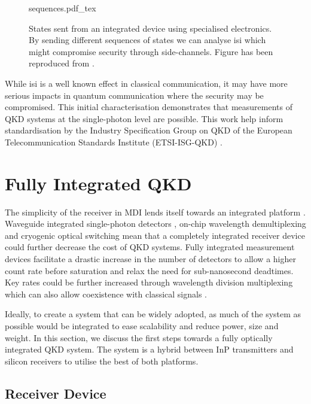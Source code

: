 \begin{figure}[t]
	\centering
	\tiny
	\def\svgwidth{\textwidth} 
	{sequences.pdf_tex}
	\caption[Security analysis of transmitters driven by specialised electronics]{States sent from an integrated device using specialised electronics. By sending different sequences of states we can analyse \ac{isi} which might compromise security through side-channels. Figure has been reproduced from \cite{vaquero2018}.}
	\label{fig:npl_states}
\end{figure}

While \ac{isi} is a well known effect in classical communication, it may have more serious impacts in quantum communication where the security may be compromised. This initial characterisation demonstrates that measurements of \ac{QKD} systems at the single-photon level are possible. This work help inform standardisation by the Industry Specification Group on QKD of the European Telecommunication Standards Institute (ETSI-ISG-QKD) \cite{ETSI}.

\section{Fully Integrated QKD}

The simplicity of the receiver in \ac{MDI} lends itself towards an integrated platform \cite{wang2019}. Waveguide integrated single-photon detectors \cite{sprengers2011}, on-chip wavelength demultiplexing \cite{sugita2000} and cryogenic optical switching \cite{eltes2019} mean that a completely integrated receiver device could further decrease the cost of \ac{QKD} systems. Fully integrated measurement devices facilitate a drastic increase in the number of detectors to allow a higher count rate before saturation and relax the need for sub-nanosecond deadtimes. Key rates could be further increased through wavelength division multiplexing which can also allow coexistence with classical signals \cite{price2018}. 

Ideally, to create a system that can be widely adopted, as much of the system as possible would be integrated to ease scalability and reduce power, size and weight. In this section, we discuss the first steps towards a fully optically integrated \ac{QKD} system. The system is a hybrid between \ac{InP} transmitters and silicon receivers to utilise the best of both platforms.

\subsection{Receiver Device}

